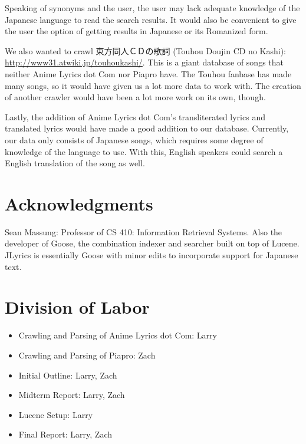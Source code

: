\documentclass{acm} %
\begin{document}
\begin{CJK}{UTF8}{zhsong}
Speaking of synonyms and the user, the user may lack adequate knowledge of the Japanese language to read the search results. It would also be convenient to give the user the option of getting results in Japanese or its Romanized form.

We also wanted to crawl 東方同人ＣＤの歌詞 (Touhou Doujin CD no Kashi): \url{http://www31.atwiki.jp/touhoukashi/}. This is a giant database of songs that neither Anime Lyrics dot Com nor Piapro have. The Touhou fanbase has made many songs, so it would have given us a lot more data to work with. The creation of another crawler would have been a lot more work on its own, though.

Lastly, the addition of Anime Lyrics dot Com's transliterated lyrics and translated lyrics would have made a good addition to our database. Currently, our data only consists of Japanese songs, which requires some degree of knowledge of the language to use. With this, English speakers could search a English translation of the song as well.

\section*{Acknowledgments}

Sean Massung: Professor of CS 410: Information Retrieval Systems. Also the developer of Goose, the combination indexer and searcher built on top of Lucene. JLyrics is essentially Goose with minor edits to incorporate support for Japanese text.

\appendix

\section{Division of Labor}

\begin{itemize}
\item Crawling and Parsing of Anime Lyrics dot Com: Larry
\item Crawling and Parsing of Piapro: Zach
\item Initial Outline: Larry, Zach
\item Midterm Report: Larry, Zach
\item Lucene Setup: Larry
\item Final Report: Larry, Zach
\end{itemize}

%

\end{CJK}
\end{document}
